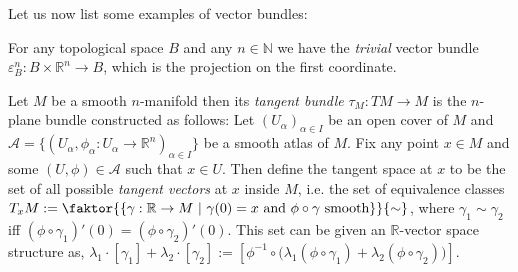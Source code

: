 Let us now list some examples of vector bundles:
\begin{examples}
\begin{i_enum}
\item For any topological space $B$ and any $n\in\mathbb{N}$ we have the \emph{trivial} vector bundle
$\varepsilon_B^n:B\times\mathbb{R}^n\to B$,
which is the projection on the first coordinate.
\item Let $M$ be a smooth $n$-manifold then its \emph{tangent bundle} $\tau_M:TM\to M$ is the $n$-plane bundle constructed as follows: Let $(U_{\alpha})_{\alpha\in I}$ be an open cover of $M$ and $\mathcal{A}=\big\{(U_{\alpha},\phi_{\alpha}:U_{\alpha}\to\mathbb{R}^n)_{\alpha\in I}\big\}$ be a smooth atlas of $M$. Fix any point $x\in M$ and some $(U,\phi)\in\mathcal{A}$ such that $x\in U$. Then define the tangent space at $x$ to be the set of all possible \emph{tangent vectors} at $x$ inside $M$, i.e. the set of equivalence classes 
$T_xM:=\faktor{\left\{\gamma:\mathbb{R}\to M\ |\ \gamma(0)=x\text{ and }\phi\circ\gamma\text{ smooth}\right\}}{\sim}$,
where $\gamma_1\sim\gamma_2$ iff $(\phi\circ\gamma_1)'(0)=(\phi\circ\gamma_2)'(0)$. This set can be given an $\mathbb{R}$-vector space structure as,
$\lambda_1\cdot[\gamma_1]+\lambda_2\cdot[\gamma_2]:=\left[\phi^{-1}\circ\big(\lambda_1(\phi\circ\gamma_1)+\lambda_2(\phi\circ\gamma_2)\big)\right]$.


\end{i_enum}
\end{examples}
